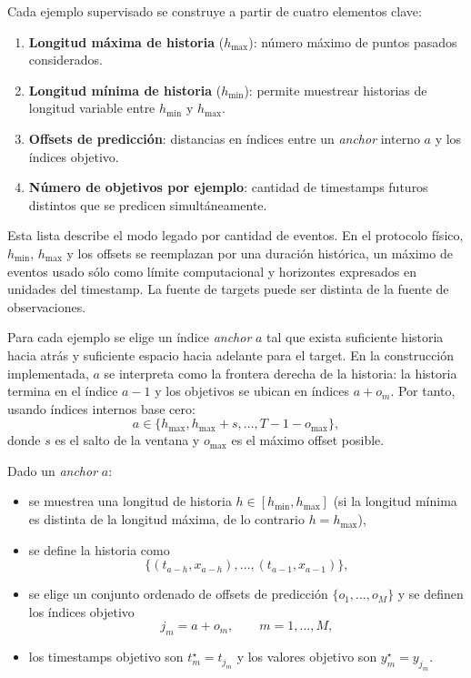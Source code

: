 Cada ejemplo supervisado se construye a partir de cuatro elementos clave:
\begin{enumerate}
    \item \textbf{Longitud máxima de historia} ($h_{\max}$): número máximo de puntos pasados considerados.
    \item \textbf{Longitud mínima de historia} ($h_{\min}$): permite muestrear historias de longitud variable entre $h_{\min}$ y $h_{\max}$.
    \item \textbf{Offsets de predicción}: distancias en índices entre un \emph{anchor} interno $a$ y los índices objetivo.
    \item \textbf{Número de objetivos por ejemplo}: cantidad de timestamps futuros distintos que se predicen simultáneamente.
\end{enumerate}

Esta lista describe el modo legado por cantidad de eventos. En el protocolo físico, $h_{\min}$, $h_{\max}$ y los offsets se reemplazan por una duración histórica, un máximo de eventos usado sólo como límite computacional y horizontes expresados en unidades del timestamp. La fuente de targets puede ser distinta de la fuente de observaciones.

Para cada ejemplo se elige un índice \emph{anchor} $a$ tal que exista suficiente historia hacia atrás y suficiente espacio hacia adelante para el target. En la construcción implementada, $a$ se interpreta como la frontera derecha de la historia: la historia termina en el índice $a-1$ y los objetivos se ubican en índices $a+o_m$. Por tanto, usando índices internos base cero:
\[
    a \in \{h_{\max}, h_{\max} + s, \dots, T - 1 - o_{\max}\},
\]
donde $s$ es el salto de la ventana y $o_{\max}$ es el máximo offset posible.

Dado un \emph{anchor} $a$:
\begin{itemize}
    \item se muestrea una longitud de historia $h \in [h_{\min}, h_{\max}]$ (si la longitud mínima es distinta de la longitud máxima, de lo contrario $h = h_{\max}$),
    \item se define la historia como
    \[
        \{(t_{a-h}, x_{a-h}), \dots, (t_{a-1}, x_{a-1})\},
    \]
    \item se elige un conjunto ordenado de offsets de predicción $\{o_1,\dots,o_M\}$ y se definen los índices objetivo
    \[
        j_m = a + o_m, \qquad m=1,\dots,M,
    \]
    \item los timestamps objetivo son $t^\star_m = t_{j_m}$ y los valores objetivo son $y^\star_m = y_{j_m}$.
\end{itemize}

